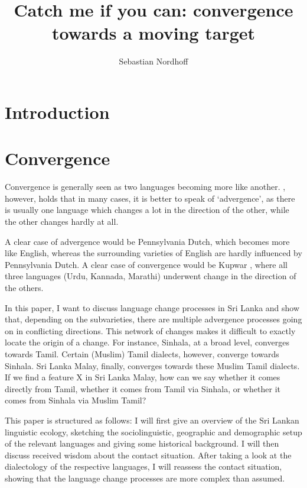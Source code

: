 \documentclass[handout,utf8]{article}
\title{Catch me if you can: convergence towards a moving target}
\author{Sebastian Nordhoff}
\begin{document}
\maketitle
 
\begin{abstract}
 
\end{abstract}

\section{Introduction}

\section{Convergence}
Convergence is generally seen as two languages becoming more like another. \citet{Mattheier1996}, however, holds that in many cases, it is better to speak of `advergence', as there is usually one language which changes a lot in the direction of the other, while the other changes hardly at all. 

A clear case of advergence would be Pennsylvania Dutch, which becomes more like English, whereas the surrounding varieties of English are hardly influenced by Pennsylvania Dutch. A clear case of convergence would be Kupwar \citep{Gumperz}, where all three languages (Urdu, Kannada, Marathi) underwent change in the direction of the others. 

In this paper, I want to discuss language change processes in Sri Lanka and show that, depending on the subvarieties,  there are multiple advergence processes going on in conflicting directions. This network of changes makes it difficult to exactly locate the origin of a change. For instance, Sinhala, at a broad level, converges towards Tamil. Certain (Muslim) Tamil dialects, however, converge towards Sinhala. Sri Lanka Malay, finally, converges towards these Muslim Tamil dialects. If we find  a feature X in Sri Lanka Malay, how can we say whether it comes directly from Tamil, whether it comes from Tamil via Sinhala, or whether it comes from Sinhala via Muslim Tamil? 

This paper is structured as follows: I will first give an overview of the Sri Lankan linguistic ecology, sketching the sociolinguistic, geographic and demographic setup of the relevant languages and giving some historical background. I will then discuss received wisdom about the contact situation. After taking a look at the dialectology of the respective languages, I will reassess the contact situation, showing that the language change processes are more complex than assumed. 
\end{document}
